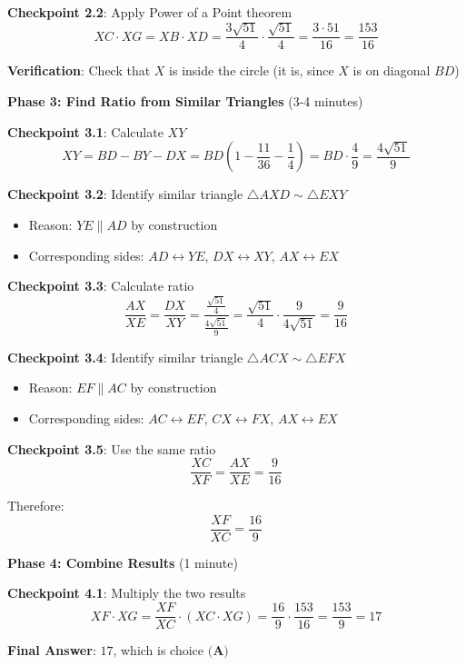 \documentclass[]{article}
\begin{document}
\begin{solutionbox}
\textbf{Checkpoint 2.2}: Apply Power of a Point theorem
\[XC \cdot XG = XB \cdot XD = \frac{3\sqrt{51}}{4} \cdot \frac{\sqrt{51}}{4} = \frac{3 \cdot 51}{16} = \frac{153}{16}\]

\textbf{Verification}: Check that $X$ is inside the circle (it is, since $X$ is on diagonal $BD$)

\hrulefill

\textbf{Phase 3: Find Ratio from Similar Triangles} (3-4 minutes)

\textbf{Checkpoint 3.1}: Calculate $XY$
\[XY = BD - BY - DX = BD\left(1 - \frac{11}{36} - \frac{1}{4}\right) = BD \cdot \frac{4}{9} = \frac{4\sqrt{51}}{9}\]

\textbf{Checkpoint 3.2}: Identify similar triangle $\triangle AXD \sim \triangle EXY$
\begin{itemize}
    \item Reason: $YE \parallel AD$ by construction
    \item Corresponding sides: $AD \leftrightarrow YE$, $DX \leftrightarrow XY$, $AX \leftrightarrow EX$
\end{itemize}

\textbf{Checkpoint 3.3}: Calculate ratio
\[\frac{AX}{XE} = \frac{DX}{XY} = \frac{\frac{\sqrt{51}}{4}}{\frac{4\sqrt{51}}{9}} = \frac{\sqrt{51}}{4} \cdot \frac{9}{4\sqrt{51}} = \frac{9}{16}\]

\textbf{Checkpoint 3.4}: Identify similar triangle $\triangle ACX \sim \triangle EFX$
\begin{itemize}
    \item Reason: $EF \parallel AC$ by construction
    \item Corresponding sides: $AC \leftrightarrow EF$, $CX \leftrightarrow FX$, $AX \leftrightarrow EX$
\end{itemize}

\textbf{Checkpoint 3.5}: Use the same ratio
\[\frac{XC}{XF} = \frac{AX}{XE} = \frac{9}{16}\]

Therefore:
\[\frac{XF}{XC} = \frac{16}{9}\]

\hrulefill

\textbf{Phase 4: Combine Results} (1 minute)

\textbf{Checkpoint 4.1}: Multiply the two results
\[XF \cdot XG = \frac{XF}{XC} \cdot (XC \cdot XG) = \frac{16}{9} \cdot \frac{153}{16} = \frac{153}{9} = 17\]

\textbf{Final Answer}: $\boxed{17}$, which is choice $\textbf{(A)}$


\end{solutionbox}
\end{document}
